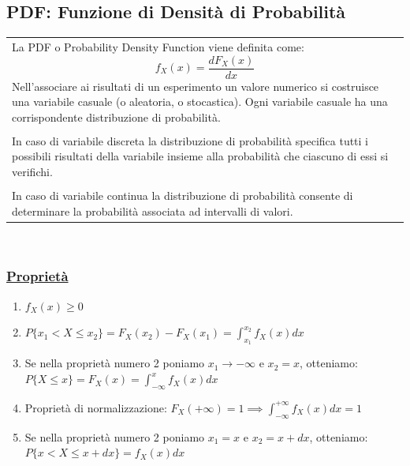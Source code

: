\documentclass{article}
\begin{document}
\subsection{PDF: Funzione di Densità di Probabilità}
\begin{tabular}{|p{13cm}}
La PDF o Probability Density Function viene definita come: 
\[f_X(x) = \frac{dF_X(x)}{dx}\]
Nell’associare ai risultati di un esperimento un valore numerico si costruisce una variabile casuale (o aleatoria, o stocastica).
Ogni variabile casuale ha una corrispondente distribuzione di probabilità. \\ \\
In caso di variabile discreta la distribuzione di probabilità specifica tutti i possibili risultati della variabile insieme alla probabilità che ciascuno di essi si verifichi. \\ \\
In caso di variabile continua la distribuzione di probabilità
consente di determinare la probabilità associata ad intervalli
di valori.
\end{tabular} \\
\subsubsection{\underline{Proprietà}}
\begin{enumerate}
    \item $f_X(x) \geq 0$
    \item $P \big\{ x_1 < X \leq x_2 \big\} = F_X(x_2) - F_X(x_1) = \int_{x_1}^{x_2} f_X(x) dx$
    \item Se nella proprietà numero 2 poniamo $x_1 \to -\infty$ e $x_2 = x$, otteniamo: \\
    $P \big\{ X \leq x \big\} = F_X(x) = \int_{-\infty}^{x} f_X(x) dx$
    \item Proprietà di normalizzazione: $F_X(+\infty) = 1 \implies \int_{-\infty}^{+\infty} f_X(x) dx = 1$
    \item Se nella proprietà numero 2 poniamo $x_1 = x$ e $x_2 = x + dx$, otteniamo: \\
    $P \big\{ x < X \leq x + dx \big\} =  f_X(x) dx$
\end{enumerate}
\end{document}
